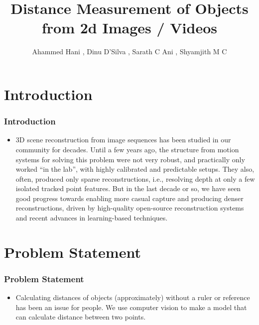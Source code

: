 \documentclass{beamer}
\title{Distance Measurement of Objects from 2d Images / Videos}
\author{Ahammed Hani , Dinu D'Silva , Sarath C Ani , Shyamjith M C}
\begin{document}
	
	\maketitle
	
	\section{Introduction}
	\begin{frame}
	\frametitle{Introduction}
	
	\begin{itemize}
		\item 3D scene reconstruction from image sequences has been studied
		in our community for decades. Until a few years ago, the structure
		from motion systems for solving this problem were not very robust,
		and practically only worked “in the lab”, with highly calibrated and
		predictable setups. They also, often, produced only sparse reconstructions, i.e., resolving depth at only a few isolated tracked point
		features. But in the last decade or so, we have seen good progress
		towards enabling more casual capture and producing denser reconstructions, driven by high-quality open-source reconstruction
		systems and recent advances in learning-based techniques.
	\end{itemize}
	
	\end{frame}
	
	
	\section{Problem Statement}
	\begin{frame}
	\frametitle{Problem Statement}
	
	\begin{itemize}
		\item Calculating distances of objects (approximately) without a ruler or reference has been an issue for people. We use computer vision to make a model that can calculate distance between two points.
	\end{itemize}
	
	\end{frame}
\end{document}
